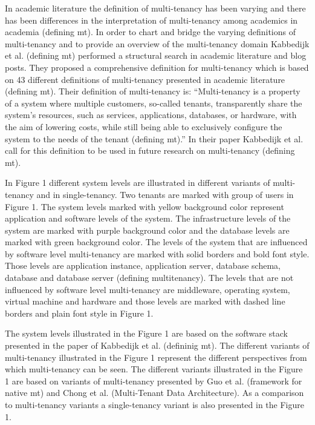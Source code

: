 \documentclass[conference]{sasmoota2017}
\begin{document}
In academic literature the definition of multi-tenancy has been varying and there has been differences in the interpretation of multi-tenancy among academics in academia (defining mt). In order to chart and bridge the varying definitions of multi-tenancy and to provide an overview of the multi-tenancy domain Kabbedijk et al. (defining mt) performed a structural search in academic literature and blog posts. They proposed a comprehensive definition for multi-tenancy which is based on 43 different definitions of multi-tenancy presented in academic literature (defining mt). Their definition of multi-tenancy is: “Multi-tenancy is a property of a system where multiple customers, so-called tenants, transparently share the system’s resources, such as services, applications, databases, or hardware, with the aim of lowering costs, while still being able to exclusively configure the system to the needs of the tenant (defining mt).” In their paper Kabbedijk et al. call for this definition to be used in future research on multi-tenancy (defining mt).

In Figure 1 different system levels are illustrated in different variants of multi-tenancy and in single-tenancy. Two tenants are marked with group of users in Figure 1. The system levels marked with yellow background color represent application and software levels of the system. The infrastructure levels of the system are marked with purple background color and the database levels are marked with green background color. The levels of the system that are influenced by software level multi-tenancy are marked with solid borders and bold font style. Those levels are application instance, application server, database schema, database and database server (defining multitenancy). The levels that are not influenced by software level multi-tenancy are middleware, operating system, virtual machine and hardware and those levels are marked with dashed line borders and plain font style in Figure 1. 

The system levels illustrated in the Figure 1 are based on the software stack presented in the paper of Kabbedijk et al. (defininig mt). The different variants of multi-tenancy illustrated in the Figure 1 represent the different perspectives from which multi-tenancy can be seen. The different variants illustrated in the Figure 1 are based on variants of multi-tenancy presented by Guo et al. (framework for native mt) and Chong et al. (Multi-Tenant Data Architecture). As a comparison to multi-tenancy variants a single-tenancy variant is also presented in the Figure 1. 
\end{document}
